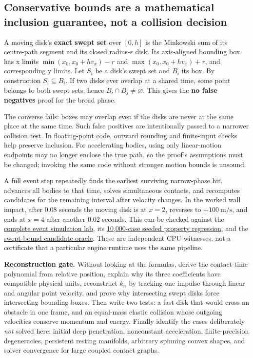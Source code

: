 \subsection{Conservative bounds are a mathematical inclusion guarantee, not a collision decision}\label{01-foundations-i-ch018-conservative-bounds-are-a-mathematical-inclusion-guarantee-not-a-collision-decision}

A moving disk's \textbf{exact swept set} over \([0,h]\) is the Minkowski sum of its centre-path segment and its closed radius-\(r\) disk. Its axis-aligned bounding box has x limits \(\min(x_0,x_0+hv_x)-r\) and \(\max(x_0,x_0+hv_x)+r\), and corresponding y limits. Let \(S_i\) be a disk's swept set and \(B_i\) its box. By construction \(S_i\subseteq B_i\). If two disks ever overlap at a shared time, some point belongs to both swept sets; hence \(B_i\cap B_j\neq\varnothing\). This gives the \textbf{no false negatives} proof for the broad phase.

The converse fails: boxes may overlap even if the disks are never at the same place at the same time. Such false positives are intentionally passed to a narrower collision test. In floating-point code, outward rounding and finite-input checks help preserve inclusion. For accelerating bodies, using only linear-motion endpoints may no longer enclose the true path, so the proof's assumptions must be changed; invoking the same code without stronger motion bounds is unsound.

A full event step repeatedly finds the earliest surviving narrow-phase hit, advances all bodies to that time, solves simultaneous contacts, and recomputes candidates for the remaining interval after velocity changes. In the worked wall impact, after \(0.08\) seconds the moving disk is at \(x=2\), reverses to \(+100\ \mathrm{m/s}\), and ends at \(x=4\) after another \(0.02\) seconds. This can be checked against the \hyperref[source-file-ad26f703e8f150d27a72bf93]{complete event simulation lab}, its \hyperref[source-file-50214a688c0ef812f3094877]{10,000-case seeded property regression}, and the \hyperref[source-file-6597829be009fc0bb1b17d87]{swept-bound candidate oracle}. These are independent CPU witnesses, not a certificate that a particular engine runtime uses the same pipeline.

\textbf{Reconstruction gate.} Without looking at the formulas, derive the contact-time polynomial from relative position, explain why its three coefficients have compatible physical units, reconstruct \(k_n\) by tracking one impulse through linear and angular point velocity, and prove why intersecting swept disks force intersecting bounding boxes. Then write two tests: a fast disk that would cross an obstacle in one frame, and an equal-mass elastic collision whose outgoing velocities conserve momentum and energy. Finally identify the cases deliberately \emph{not} solved here: initial deep penetration, nonconstant acceleration, finite-precision degeneracies, persistent resting manifolds, arbitrary spinning convex shapes, and solver convergence for large coupled contact graphs.

